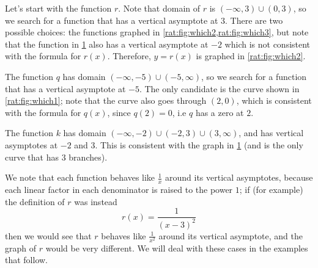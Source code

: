 \begin{pccexample}
\begin{figure}[!htb]
\begin{subfigure}{\figurewidth}
            \caption{}
            \label{rat:fig:which3}
    \end{subfigure}
    \caption{}
    \label{rat:fig:whichiswhich}
\end{figure}

\begin{pccsolution}
Let's start with the function $r$. Note that domain of $r$ is $(-\infty,3)\cup(0,3)$, so 
we search for a function that has a vertical asymptote at $3$. There 
are two possible choices: the functions graphed in \cref{rat:fig:which2,rat:fig:which3}, 
but note that the function in \cref{rat:fig:which3} also has a vertical asymptote at $-2$ 
which is not consistent with the formula for $r(x)$. Therefore, $y=r(x)$
is graphed in \cref{rat:fig:which2}. 

The function $q$ has domain $(-\infty,-5)\cup(-5,\infty)$, so we search 
for a function that has a vertical asymptote at $-5$. The only candidate 
is the curve shown in \cref{rat:fig:which1}; note that the curve also goes through $(2,0)$, 
which is consistent with the formula for $q(x)$, since $q(2)=0$, i.e $q$
has a zero at $2$.

The function $k$ has domain $(-\infty,-2)\cup(-2,3)\cup(3,\infty)$, and 
has vertical asymptotes at $-2$ and $3$. This is consistent with 
the graph in \cref{rat:fig:which3} (and is the only curve that 
has $3$ branches).

We note that each function behaves like $\frac{1}{x}$ around its vertical asymptotes, 
because each linear factor in each denominator is raised to the power $1$; if (for example) 
the definition of $r$ was instead
\[
r(x)=\frac{1}{(x-3)^2}
\]
then we would see that $r$ behaves like $\frac{1}{x^2}$ around its vertical asymptote, and 
the graph of $r$ would be very different. We will deal with these cases in the examples that follow.
\end{pccsolution}
\end{pccexample}

